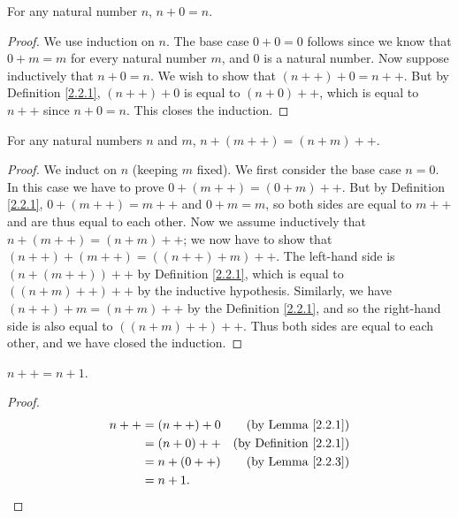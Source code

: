 \begin{lemma}\label{2.2.2}
    For any natural number \(n\), \(n + 0 = n\).
\end{lemma}

\begin{proof}
    We use induction on \(n\).
    The base case \(0 + 0 = 0\) follows since we know that \(0 + m = m\) for every natural number \(m\), and \(0\) is a natural number.
    Now suppose inductively that \(n + 0 = n\).
    We wish to show that \((n++) + 0 = n++\).
    But by Definition \ref{2.2.1}, \((n++) + 0\) is equal to \((n + 0)++\), which is equal to \(n++\) since \(n + 0 = n\).
    This closes the induction.
\end{proof}

\begin{lemma}\label{2.2.3}
    For any natural numbers \(n\) and \(m\), \(n + (m++) = (n + m)++\).
\end{lemma}

\begin{proof}
    We induct on \(n\) (keeping \(m\) fixed).
    We first consider the base case \(n = 0\).
    In this case we have to prove \(0 + (m++) = (0 + m)++\).
    But by Definition \ref{2.2.1}, \(0 + (m++) = m++\) and \(0 + m = m\), so both sides are equal to \(m++\) and are thus equal to each other.
    Now we assume inductively that \(n + (m++) = (n + m)++\);
    we now have to show that \((n++) + (m++) = ((n++) + m)++\).
    The left-hand side is \((n + (m++))++\) by Definition \ref{2.2.1}, which is equal to \(((n+m)++)++\) by the inductive hypothesis.
    Similarly, we have \((n++) + m = (n + m)++\) by the Definition \ref{2.2.1}, and so the right-hand side is also equal to \(((n + m)++)++\).
    Thus both sides are equal to each other, and we have closed the induction.
\end{proof}

\begin{additional corollary}\label{ac 2.2.2}
\(n++ = n + 1\).
\end{additional corollary}

\begin{proof}
    \begin{align*}
        n++ & = (n++) + 0 & \text{(by Lemma \ref{2.2.1})}      \\
            & = (n + 0)++ & \text{(by Definition \ref{2.2.1})} \\
            & = n + (0++) & \text{(by Lemma \ref{2.2.3})}      \\
            & = n + 1.
    \end{align*}
\end{proof}

